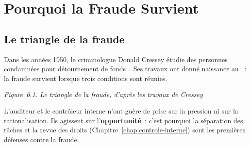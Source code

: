 \section{Pourquoi la Fraude Survient}
\label{sec:c06-triangle}

\subsection{Le triangle de la fraude}

Dans les années 1950, le criminologue Donald Cressey étudie des personnes
condamnées pour détournement de fonds~\cite{cressey1953}. Ses travaux ont
donné naissance au ~: la fraude survient lorsque trois conditions sont réunies.

\noindent\begin{minipage}{\linewidth}
\begin{center}
\end{center}
\vspace{-0.4em}
\begin{center}{\small\itshape Figure~6.1. Le triangle de la fraude, d'après
les travaux de Cressey}\end{center}
\end{minipage}

\medskip

L'auditeur et le contrôleur interne n'ont guère de prise sur la pression ni
sur la rationalisation. Ils agissent sur l'\textbf{opportunité}~: c'est
pourquoi la séparation des tâches et la revue des droits
(Chapitre~\ref{chap:controle-interne}) sont les premières défenses contre la
fraude.

